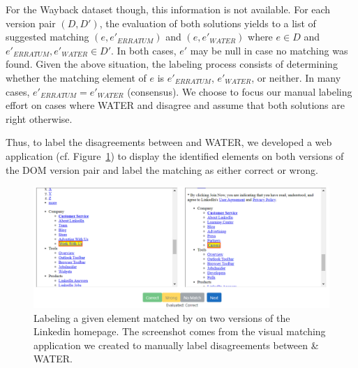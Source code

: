 For the {\sc Wayback} dataset though, this information is not available.
For each version pair $(D, D')$, the evaluation of both solutions yields to a list of suggested matching $(e, e'_{ERRATUM})$ and $(e, e'_{WATER})$ where $e \in D$ and $e'_{ERRATUM}, e'_{WATER} \in D'$.
In both cases, $e'$ may be null in case no matching was found.
Given the above situation, the labeling process consists of determining whether the matching element of $e$ is $e'_{ERRATUM}$, $e'_{WATER}$, or neither.
In many cases, $e'_{ERRATUM} = e'_{WATER}$ (consensus).
We choose to focus our manual labeling effort on cases where WATER and \erratum{} disagree and assume that both solutions are right otherwise.

Thus, to label the disagreements between \erratum{} and WATER, we developed a web application (cf. Figure~\ref{fig:disagreement}) to display the identified elements on both versions of the DOM version pair and label the matching as either correct or wrong.

\begin{figure}
  \begin{center}
  \includegraphics[width=1.1\linewidth]{erratum/disagreement}
  \caption{Labeling a given element matched by \erratum{} on two versions of the \textsf{Linkedin} homepage. The screenshot comes from the visual matching application we created to manually label disagreements between \erratum{} \& WATER.}
  \label{fig:disagreement}
  \end{center}
\end{figure}


